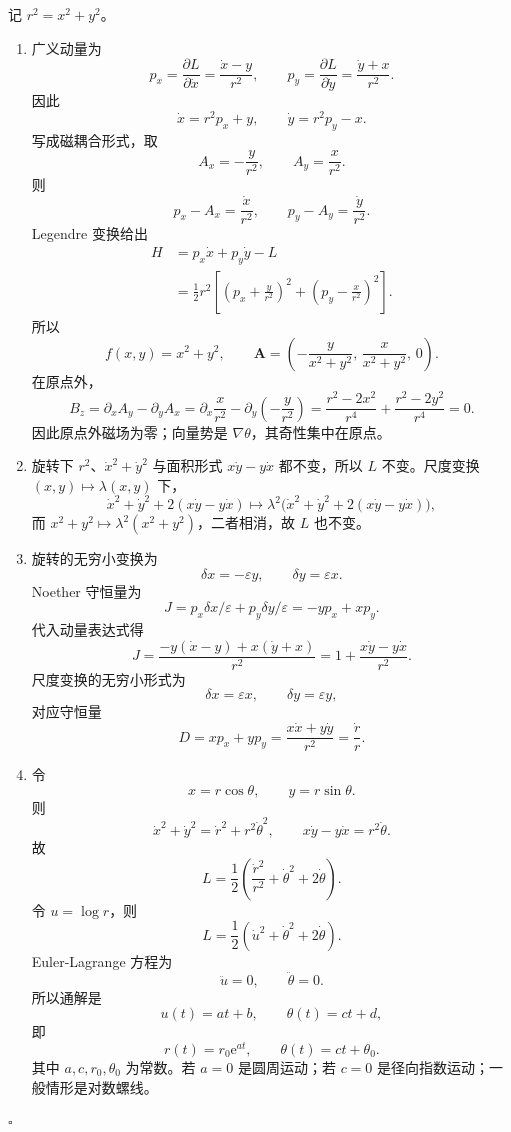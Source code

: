 \documentclass[UTF8,12pt]{ctexart}
\newcommand{\ee}{\mathrm e}
\newenvironment{solution}{%
  \par\medskip
  \noindent{\bfseries 解答}\quad\ignorespaces
}{\hfill$\square$\par\medskip}
\begin{document}
\begin{solution}
记 \(r^2=x^2+y^2\)。
\begin{enumerate}[label=(\alph*)]
\item 广义动量为
\[
p_x=\frac{\partial L}{\partial \dot x}
=\frac{\dot x-y}{r^2},\qquad
p_y=\frac{\partial L}{\partial \dot y}
=\frac{\dot y+x}{r^2}.
\]
因此
\[
\dot x=r^2p_x+y,\qquad
\dot y=r^2p_y-x.
\]
写成磁耦合形式，取
\[
A_x=-\frac{y}{r^2},\qquad A_y=\frac{x}{r^2}.
\]
则
\[
p_x-A_x=\frac{\dot x}{r^2},\qquad
p_y-A_y=\frac{\dot y}{r^2}.
\]
Legendre 变换给出
\[
\begin{aligned}
H&=p_x\dot x+p_y\dot y-L\\
&=\frac12 r^2\left[
\left(p_x+\frac{y}{r^2}\right)^2
+\left(p_y-\frac{x}{r^2}\right)^2
\right].
\end{aligned}
\]
所以
\[
f(x,y)=x^2+y^2,\qquad
\bm A=\left(-\frac{y}{x^2+y^2},\,\frac{x}{x^2+y^2},\,0\right).
\]
在原点外，
\[
B_z=\partial_xA_y-\partial_yA_x
=\partial_x\frac{x}{r^2}-\partial_y\left(-\frac{y}{r^2}\right)
=\frac{r^2-2x^2}{r^4}+\frac{r^2-2y^2}{r^4}=0.
\]
因此原点外磁场为零；向量势是 \(\nabla\theta\)，其奇性集中在原点。

\item 旋转下 \(r^2\)、\(\dot x^2+\dot y^2\) 与面积形式 \(x\dot y-y\dot x\) 都不变，所以 \(L\) 不变。尺度变换 \((x,y)\mapsto \lambda(x,y)\) 下，
\[
\dot x^2+\dot y^2+2(x\dot y-y\dot x)
\mapsto \lambda^2\bigl(\dot x^2+\dot y^2+2(x\dot y-y\dot x)\bigr),
\]
而 \(x^2+y^2\mapsto\lambda^2(x^2+y^2)\)，二者相消，故 \(L\) 也不变。

\item 旋转的无穷小变换为
\[
\delta x=-\varepsilon y,\qquad \delta y=\varepsilon x.
\]
Noether 守恒量为
\[
J=p_x\delta x/\varepsilon+p_y\delta y/\varepsilon
=-yp_x+xp_y.
\]
代入动量表达式得
\[
J=\frac{-y(\dot x-y)+x(\dot y+x)}{r^2}
=1+\frac{x\dot y-y\dot x}{r^2}.
\]
尺度变换的无穷小形式为
\[
\delta x=\varepsilon x,\qquad \delta y=\varepsilon y,
\]
对应守恒量
\[
D=xp_x+yp_y
=\frac{x\dot x+y\dot y}{r^2}
=\frac{\dot r}{r}.
\]

\item 令
\[
x=r\cos\theta,\qquad y=r\sin\theta.
\]
则
\[
\dot x^2+\dot y^2=\dot r^2+r^2\dot\theta^2,\qquad
x\dot y-y\dot x=r^2\dot\theta.
\]
故
\[
L=\frac12\left(\frac{\dot r^2}{r^2}+\dot\theta^2+2\dot\theta\right).
\]
令 \(u=\log r\)，则
\[
L=\frac12(\dot u^2+\dot\theta^2+2\dot\theta).
\]
Euler-Lagrange 方程为
\[
\ddot u=0,\qquad \ddot\theta=0.
\]
所以通解是
\[
u(t)=at+b,\qquad \theta(t)=ct+d,
\]
即
\[
r(t)=r_0\ee^{at},\qquad \theta(t)=ct+\theta_0.
\]
其中 \(a,c,r_0,\theta_0\) 为常数。若 \(a=0\) 是圆周运动；若 \(c=0\) 是径向指数运动；一般情形是对数螺线。
\end{enumerate}
\end{solution}
\end{document}
